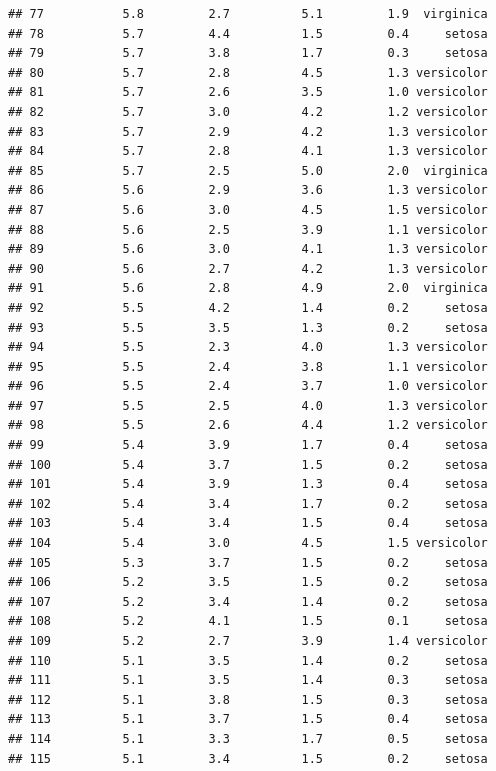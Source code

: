 \documentclass[
]{article}
\begin{document}
\begin{verbatim}
## 77           5.8         2.7          5.1         1.9  virginica
## 78           5.7         4.4          1.5         0.4     setosa
## 79           5.7         3.8          1.7         0.3     setosa
## 80           5.7         2.8          4.5         1.3 versicolor
## 81           5.7         2.6          3.5         1.0 versicolor
## 82           5.7         3.0          4.2         1.2 versicolor
## 83           5.7         2.9          4.2         1.3 versicolor
## 84           5.7         2.8          4.1         1.3 versicolor
## 85           5.7         2.5          5.0         2.0  virginica
## 86           5.6         2.9          3.6         1.3 versicolor
## 87           5.6         3.0          4.5         1.5 versicolor
## 88           5.6         2.5          3.9         1.1 versicolor
## 89           5.6         3.0          4.1         1.3 versicolor
## 90           5.6         2.7          4.2         1.3 versicolor
## 91           5.6         2.8          4.9         2.0  virginica
## 92           5.5         4.2          1.4         0.2     setosa
## 93           5.5         3.5          1.3         0.2     setosa
## 94           5.5         2.3          4.0         1.3 versicolor
## 95           5.5         2.4          3.8         1.1 versicolor
## 96           5.5         2.4          3.7         1.0 versicolor
## 97           5.5         2.5          4.0         1.3 versicolor
## 98           5.5         2.6          4.4         1.2 versicolor
## 99           5.4         3.9          1.7         0.4     setosa
## 100          5.4         3.7          1.5         0.2     setosa
## 101          5.4         3.9          1.3         0.4     setosa
## 102          5.4         3.4          1.7         0.2     setosa
## 103          5.4         3.4          1.5         0.4     setosa
## 104          5.4         3.0          4.5         1.5 versicolor
## 105          5.3         3.7          1.5         0.2     setosa
## 106          5.2         3.5          1.5         0.2     setosa
## 107          5.2         3.4          1.4         0.2     setosa
## 108          5.2         4.1          1.5         0.1     setosa
## 109          5.2         2.7          3.9         1.4 versicolor
## 110          5.1         3.5          1.4         0.2     setosa
## 111          5.1         3.5          1.4         0.3     setosa
## 112          5.1         3.8          1.5         0.3     setosa
## 113          5.1         3.7          1.5         0.4     setosa
## 114          5.1         3.3          1.7         0.5     setosa
## 115          5.1         3.4          1.5         0.2     setosa

\end{verbatim}
\end{document}
